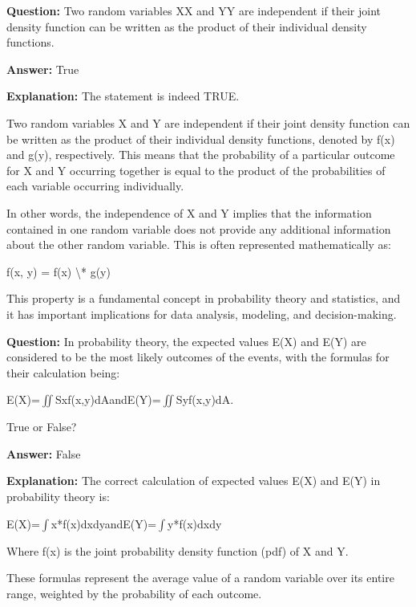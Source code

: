 \documentclass{article}
\begin{document}
                \vspace{0.5cm} 
        
            
                \textbf {Question:} Two random variables XX and YY are independent if their joint density function can be written as the product of their individual density functions.
                
                \textbf{Answer:} True

                \textbf{Explanation:} The statement is indeed TRUE.

Two random variables X and Y are independent if their joint density function can be written as the product of their individual density functions, denoted by f(x) and g(y), respectively. This means that the probability of a particular outcome for X and Y occurring together is equal to the product of the probabilities of each variable occurring individually.

In other words, the independence of X and Y implies that the information contained in one random variable does not provide any additional information about the other random variable. This is often represented mathematically as:

f(x, y) = f(x) {\textbackslash}* g(y)

This property is a fundamental concept in probability theory and statistics, and it has important implications for data analysis, modeling, and decision-making.
                
                \vspace{0.5cm} 
        
            
                \textbf {Question:} In probability theory, the expected values E(X) and E(Y) are considered to be the most likely outcomes of the events, with the formulas for their calculation being:

E(X)=\ensuremath{\iint}Sxf(x,y)dAandE(Y)=\ensuremath{\iint}Syf(x,y)dA.

True or False?
                
                \textbf{Answer:} False

                \textbf{Explanation:} The correct calculation of expected values E(X) and E(Y) in probability theory is:

E(X)=\ensuremath{\int}x*f(x)dxdyandE(Y)=\ensuremath{\int}y*f(x)dxdy

Where f(x) is the joint probability density function (pdf) of X and Y.

These formulas represent the average value of a random variable over its entire range, weighted by the probability of each outcome. 
\end{document}
